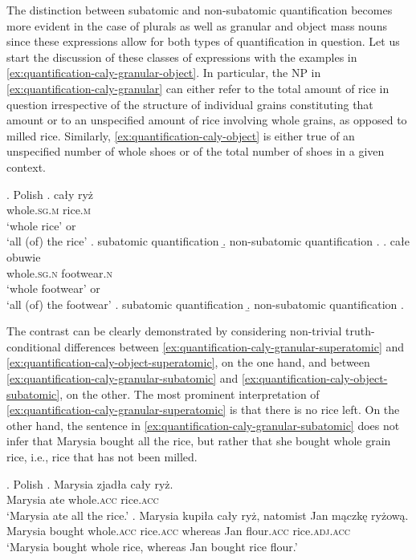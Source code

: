 The distinction between subatomic and non-subatomic quantification becomes more evident in the case of plurals as well as granular and object mass nouns since these expressions allow for both types of quantification in question. Let us start the discussion of these classes of expressions with the examples in \ref{ex:quantification-caly-granular-object}. In particular, the NP in \ref{ex:quantification-caly-granular} can either refer to the total amount of rice in question irrespective of the structure of individual grains constituting that amount or to an unspecified amount of rice involving whole grains, as opposed to milled rice. Similarly, \ref{ex:quantification-caly-object} is either true of an unspecified number of whole shoes or of the total number of shoes in a given context.

		\ex. Polish\label{ex:quantification-caly-granular-object}
        \ag. cały ryż\label{ex:quantification-caly-granular}\\
		whole\textsc{.sg.m} rice\textsc{.m}\\
		`whole rice' or\\
		`all (of) the rice'
		\a. subatomic quantification
		\b. non-subatomic quantification
        \z. 
		\bg. całe obuwie\label{ex:quantification-caly-object}\\
		whole\textsc{.sg.n} footwear\textsc{.n}\\
		`whole footwear' or\\
		`all (of) the footwear'
		\a. subatomic quantification
		\b. non-subatomic quantification
        \z.

The contrast can be clearly demonstrated by considering non-trivial truth-con\-ditional differences between \ref{ex:quantification-caly-granular-superatomic} and \ref{ex:quantification-caly-object-superatomic}, on the one hand, and between \ref{ex:quantification-caly-granular-subatomic} and \ref{ex:quantification-caly-object-subatomic}, on the other. The most prominent interpretation of \ref{ex:quantification-caly-granular-superatomic} is that there is no rice left. On the other hand, the sentence in \ref{ex:quantification-caly-granular-subatomic} does not infer that Marysia bought all the rice, but rather that she bought whole grain rice, i.e., rice that has not been milled. 

\ex. Polish\label{ex:quantification-caly-granular-ambiguity}
\ag. Marysia zjadła cały ryż.\label{ex:quantification-caly-granular-superatomic}\\
Marysia ate whole\textsc{.acc} rice\textsc{.acc}\\
`Marysia ate all the rice.'
\bg. Marysia kupiła cały ryż, natomist Jan mączkę ryżową.\label{ex:quantification-caly-granular-subatomic}\\
Marysia bought whole\textsc{.acc} rice\textsc{.acc} whereas Jan flour\textsc{.acc} rice\textsc{.adj.acc}\\
`Marysia bought whole rice, whereas Jan bought rice flour.'

